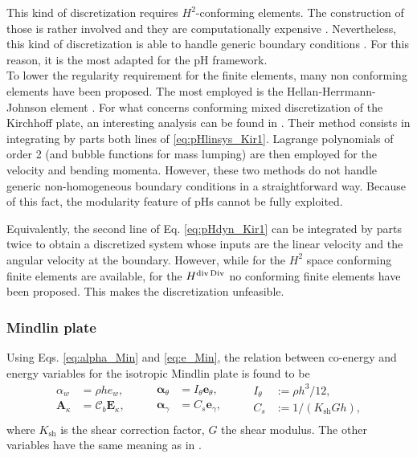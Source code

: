 This kind of discretization requires $H^2$-conforming elements. The construction of those is rather involved and they are computationally expensive \cite{argyris1968,bell1969}. Nevertheless, this kind of discretization is able to handle generic boundary conditions \cite{gustafsson2018}. For this reason, it is the most adapted for the pH framework. \\

To lower the regularity requirement for the finite elements, many non conforming elements have been proposed. The most employed is the Hellan-Herrmann-Johnson element \cite{arnold1985mixed,blum1990}. For what concerns conforming mixed discretization of the Kirchhoff plate, an interesting analysis can be found in \cite{becache2005kirchhoff}. Their method consists in integrating by parts both lines of \ref{eq:pHlinsys_Kir1}. Lagrange polynomials of order 2 (and bubble functions for mass lumping) are then employed for the velocity and bending momenta. However, these two methods do not handle generic non-homogeneous boundary conditions in a straightforward way. Because of this fact, the modularity feature of pHs cannot be fully exploited.   \\

\begin{remark}\label{rmk:HdivDiv}
	Equivalently, the second line of Eq. \eqref{eq:pHdyn_Kir1} can be integrated by parts twice to obtain a discretized system whose inputs are the linear velocity and the angular velocity at the boundary. However, while for the $H^2$ space conforming finite elements are available, for the $H^{\operatorname{div}\operatorname*{Div}}$ no conforming finite elements have been proposed. This makes the discretization unfeasible. 
\end{remark}

\subsubsection{Mindlin plate}\label{sec:discr_Min}
Using Eqs. \eqref{eq:alpha_Min} and \eqref{eq:e_Min}, the relation between co-energy and energy variables for the isotropic Mindlin plate is found to be
\begin{equation}
\begin{aligned}
\alpha_w &= \rho h e_w, \\
\bm{A}_{\kappa} &= \bm{\mathcal{C}}_b \bm{E}_\kappa,\\
\end{aligned} \qquad
\begin{aligned}
\bm{\alpha}_{\theta} &= I_\theta \bm{e}_\theta,\\
\bm{\alpha}_{\gamma} &= C_s \bm{e}_{\gamma}, \\
\end{aligned} \qquad
\begin{aligned}
I_\theta &:= {\rho h^3}/{12},\\
C_s &:= {1}/{(K_{\text{sh}}Gh)}, \\
\end{aligned}
\end{equation}
where $K_{\text{sh}}$ is the shear correction factor, $G$ the shear modulus. The other variables have the same meaning as in . 

